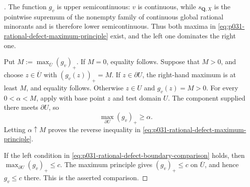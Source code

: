 
\begin{proof}[]
The function $g_v$ is upper semicontinuous: $v$ is continuous, while
$s_{\mathbf Q,X}$ is the pointwise supremum of the nonempty family of
continuous global rational minorants and is therefore lower
semicontinuous.  Thus both maxima in
\eqref{eq:p031-rational-defect-maximum-principle} exist, and the left one
dominates the right one.

Put $M:=\max_{\overline U}(g_v)_+$.  If $M=0$, equality follows.  Suppose
that $M>0$, and choose $z\in\overline U$ with $(g_v(z))_+=M$.
If $z\in\partial U$, the right-hand maximum is at least $M$, and equality
follows.  Otherwise $z\in U$ and
$g_v(z)=M>0$.  For every $0<\alpha<M$, apply
 with base point $z$ and test domain
$U$.  The component supplied there meets $\partial U$, so
\[
                       \max_{\partial U}(g_v)_+\geq\alpha.
\]
Letting $\alpha\uparrow M$ proves the reverse inequality in
\eqref{eq:p031-rational-defect-maximum-principle}.

If the left condition in
\eqref{eq:p031-rational-defect-boundary-comparison} holds, then
$\max_{\partial U}(g_v)_+\leq c$.  The maximum principle gives
$(g_v)_+\leq c$ on $\overline U$, and hence $g_v\leq c$ there.  This is
the asserted comparison.
\end{proof}

